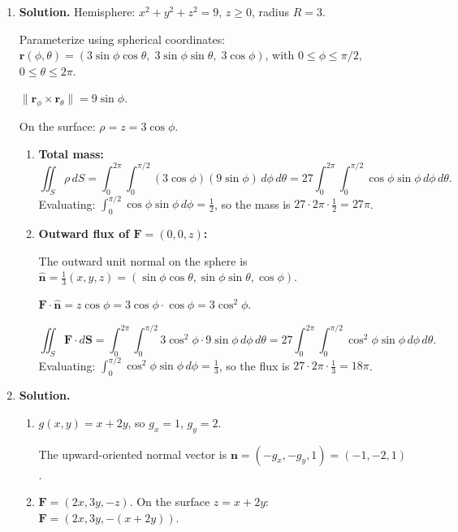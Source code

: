 \begin{enumerate}
On the cylinder, $f=\sqrt{x^2+y^2}=2$.
\[
\iint_S f\,dS = \int_0^{2\pi}\int_0^3 2\cdot 2\,dz\,d\theta = \int_0^{2\pi}\int_0^3 4\,dz\,d\theta = 4\cdot 3\cdot 2\pi = \boxed{24\pi}.
\]

\item \textbf{Solution.}
Hemisphere: $x^2+y^2+z^2=9$, $z\ge 0$, radius $R=3$.

Parameterize using spherical coordinates: $\mathbf{r}(\phi,\theta)=(3\sin\phi\cos\theta,\;3\sin\phi\sin\theta,\;3\cos\phi)$, with $0\le\phi\le\pi/2$, $0\le\theta\le 2\pi$.

$\|\mathbf{r}_\phi\times\mathbf{r}_\theta\| = 9\sin\phi$.

On the surface: $\rho = z = 3\cos\phi$.

\begin{enumerate}
\item \textbf{Total mass:}
\[
\boxed{\iint_S \rho\,dS = \int_0^{2\pi}\int_0^{\pi/2}(3\cos\phi)(9\sin\phi)\,d\phi\,d\theta = 27\int_0^{2\pi}\int_0^{\pi/2}\cos\phi\sin\phi\,d\phi\,d\theta.}
\]
Evaluating: $\int_0^{\pi/2}\cos\phi\sin\phi\,d\phi = \frac{1}{2}$, so the mass is $27\cdot2\pi\cdot\frac{1}{2}=27\pi$.

\item \textbf{Outward flux of $\mathbf{F}=(0,0,z)$:}

The outward unit normal on the sphere is $\hat{\mathbf{n}}=\frac{1}{3}(x,y,z)=(\sin\phi\cos\theta,\sin\phi\sin\theta,\cos\phi)$.

$\mathbf{F}\cdot\hat{\mathbf{n}} = z\cos\phi = 3\cos\phi\cdot\cos\phi = 3\cos^2\phi$.

\[
\boxed{\iint_S\mathbf{F}\cdot d\mathbf{S} = \int_0^{2\pi}\int_0^{\pi/2}3\cos^2\phi\cdot 9\sin\phi\,d\phi\,d\theta = 27\int_0^{2\pi}\int_0^{\pi/2}\cos^2\phi\sin\phi\,d\phi\,d\theta.}
\]
Evaluating: $\int_0^{\pi/2}\cos^2\phi\sin\phi\,d\phi = \frac{1}{3}$, so the flux is $27\cdot2\pi\cdot\frac{1}{3}=18\pi$.
\end{enumerate}

\item \textbf{Solution.}
\begin{enumerate}
\item $g(x,y)=x+2y$, so $g_x=1$, $g_y=2$.

The upward-oriented normal vector is $\mathbf{n}=(-g_x,-g_y,1)=(-1,-2,1)$.

\item $\mathbf{F}=(2x,3y,-z)$. On the surface $z=x+2y$: $\mathbf{F}=(2x, 3y, -(x+2y))$.


\end{enumerate}
\end{enumerate}
